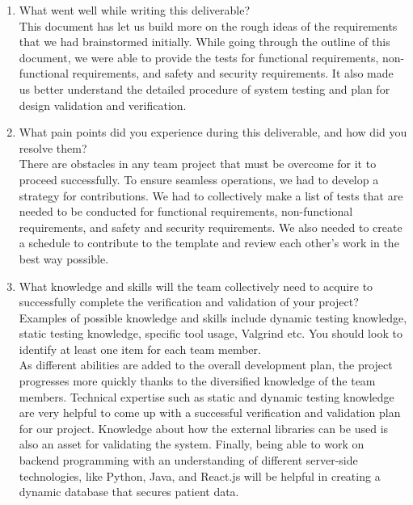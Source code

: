 \documentclass[12pt, titlepage]{article}
\begin{document}


\begin{enumerate}
  \item What went well while writing this deliverable?\\
  This document has let us build more on the rough ideas of the requirements that we had brainstormed initially. While going through the outline of this document, we were able to provide the tests for functional requirements, non-functional requirements, and safety and security requirements. It also made us better understand the detailed procedure of system testing and plan for design validation and verification. 
  
  \item What pain points did you experience during this deliverable, and how did you resolve them?\\
  There are obstacles in any team project that must be overcome for it to proceed successfully. To ensure seamless operations, we had to develop a strategy for contributions. We had to collectively make a list of tests that are needed to be conducted for functional requirements, non-functional requirements, and safety and security requirements. We also needed to create a schedule to contribute to the template and review each other's work in the best way possible.

  \item What knowledge and skills will the team collectively need to acquire to successfully complete the verification and validation of your project? Examples of possible knowledge and skills include dynamic testing knowledge, static testing knowledge, specific tool usage, Valgrind etc.  You should look to identify at least one item for each team member.\\
  As different abilities are added to the overall development plan, the project progresses more quickly thanks to the diversified knowledge of the team members. Technical expertise such as static and dynamic testing knowledge are very helpful to come up with a successful verification and validation plan for our project. Knowledge about how the external libraries can be used is also an asset for validating the system. Finally, being able to work on backend programming with an understanding of different server-side technologies, like Python, Java, and React.js will be helpful in creating a dynamic database that secures patient data.


\end{enumerate}
\end{document}
